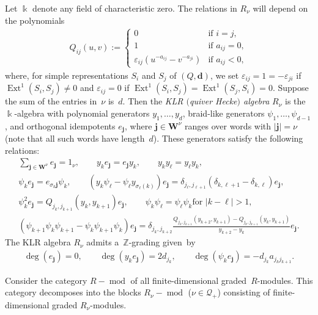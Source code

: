 \documentclass[pdftex]{sigma}
\numberwithin{equation}{section}
\begin{document}
Let $\Bbbk$ denote any f\/ield of characteristic zero.
The relations in $R_\nu$ will depend on the polynomials
\begin{gather*}
Q_{ij}(u,v):=
\begin{cases}
0 & \text{if $i=j$},
\\
1 & \text{if $a_{ij}=0$},  %
\\
\varepsilon_{ij}(u^{-a_{ij}}-v^{-a_{ji}}) & \text{if $a_{ij}<0$},
\end{cases}
\end{gather*}
where, for simple representations $S_i$ and $S_j$ of $(Q,\mathbf{d})$, we set $\varepsilon_{ij}=1=-\varepsilon_{ji}$ if
$\operatorname{Ext}^1(S_i,S_j)\ne0$ and $\varepsilon_{ij}=0$ if
$\operatorname{Ext}^1(S_i,S_j)=\operatorname{Ext}^1(S_j,S_i)=0$.
Suppose the sum of the entries in~$\nu$ is~$d$.
Then the \emph{KLR $($quiver Hecke$)$ algebra} $R_\nu$ is the $\Bbbk$-algebra with polynomial generators $y_1,\ldots,y_d$,
braid-like generators $\psi_1,\ldots,\psi_{d-1}$, and orthogonal idempotents $e_\mathbf{j}$, where
$\mathbf{j}\in\mathbf{W}^\nu$ ranges over words with $|\mathbf{j}|=\nu$ (note that all such words have length~$d$).
These generators satisfy the following relations:
\begin{gather*}
\sum\limits_{\mathbf{j}\in\mathbf{W}^\nu}e_\mathbf{j}=1_\nu,
\qquad
y_ke_\mathbf{j}=e_\mathbf{j} y_k,
\qquad
y_k y_\ell=y_\ell y_k,
\\
\psi_k e_\mathbf{j}=e_{\sigma_k\mathbf{j}}\psi_k,
\qquad
(y_k\psi_\ell-\psi_\ell
y_{\sigma_\ell(k)})e_\mathbf{j}=\delta_{j_\ell,j_{\ell+1}}(\delta_{k,\ell+1}-\delta_{k,\ell})e_\mathbf{j},
\\
\psi_k^2 e_\mathbf{j}=Q_{j_k,j_{k+1}}(y_k,y_{k+1}) e_\mathbf{j},
\qquad
\psi_k\psi_\ell=\psi_\ell\psi_k \text{for $|k-\ell|>1$,}
\\
(\psi_{k+1}\psi_k\psi_{k+1}-\psi_k\psi_{k+1}\psi_k)
e_\mathbf{j}=\delta_{j_k,j_{k+2}}\frac{Q_{j_k,j_{k+1}}(y_{k+2},y_{k+1})-Q_{j_k,j_{k+1}}(y_k,y_{k+1})}{y_{k+2}-y_k}
e_\mathbf{j}.
\end{gather*}
The KLR algebra $R_\nu$ admits a~$\mathbb{Z}$-grading given~by
\begin{gather*}
\deg(e_\mathbf{j})=0,
\qquad
\deg(y_k e_\mathbf{j})=2d_{j_k},
\qquad
\deg(\psi_k e_\mathbf{j})=-d_{j_k}a_{j_k j_{k+1}}.
\end{gather*}

Consider the category $R-\operatorname{mod}$ of all f\/inite-dimensional graded~$R$-modules.
This category decomposes into the blocks $R_\nu-\operatorname{mod}$ ($\nu\in\mathcal{Q}_+$) consisting of
f\/inite-dimensional graded $R_\nu$-modules.
\end{document}
